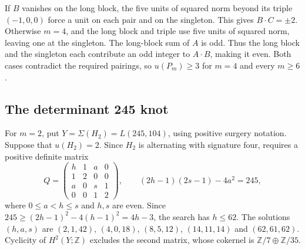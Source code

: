 \documentclass[a4paper,11pt]{amsart}
\numberwithin{equation}{subsection}
\theoremstyle{plain}
\theoremstyle{remark}
\begin{document}
If $B$ vanishes on the long block, the five units of squared norm beyond its triple $(-1,0,0)$ force a unit on each pair and on the singleton. This gives $B\cdot C=\pm2$. Otherwise $m=4$, and the long block and triple use five units of squared norm, leaving one at the singleton. The long-block sum of $A$ is odd. Thus the long block and the singleton each contribute an odd integer to $A\cdot B$, making it even. Both cases contradict the required pairings, so $u(P_m)\geq3$ for $m=4$ and every $m\geq6$.

\subsection{The determinant 245 knot}\label{sub:determinant245}

For $m=2$, put $Y=\Sigma(H_2)=L(245,104)$, using positive
surgery notation. Suppose that $u(H_2)=2$. Since $H_2$ is
alternating with signature four, \cite[Theorem 1]{Owens}
requires a positive definite matrix
\[
Q=\begin{pmatrix}h&1&a&0\\1&2&0&0\\a&0&s&1\\0&0&1&2\end{pmatrix},\qquad
(2h-1)(2s-1)-4a^2=245,
\]
where $0\leq a<h\leq s$ and $h,s$ are even. Since $245\geq(2h-1)^2-4(h-1)^2=4h-3$, the search has $h\leq62$. The solutions $(h,a,s)$ are $(2,1,42)$, $(4,0,18)$, $(8,5,12)$, $(14,11,14)$ and $(62,61,62)$. Cyclicity of $H^2(Y;\mathbb Z)$ excludes the second matrix, whose cokernel is $\mathbb Z/7\oplus\mathbb Z/35$.
\end{document}
